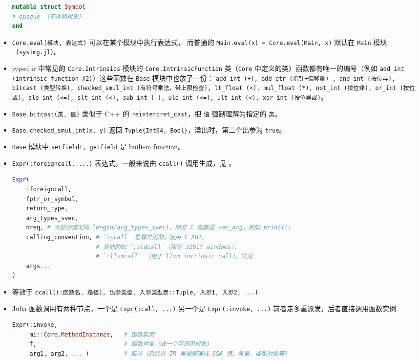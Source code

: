 \begin{itemize}
\begin{lstlisting}[language=julia]
mutable struct Symbol
# opaque （不透明对象）
end
\end{lstlisting}
\item \verb`Core.eval(模块, 表达式)` 可以在某个模块中执行表达式， 而普通的 \verb`Main.eval(x) = Core.eval(Main, x)` 默认在 \verb`Main` 模块（\verb`sysimg.jl`）。
\item typed ir 中常见的 \verb`Core.Intrinsics` 模块的 \verb`Core.IntrinsicFunction` 类（\verb`Core` 中定义的类）函数都有唯一的编号（例如 \verb`add_int (intrinsic function #2)`）这些函数在 \verb`Base` 模块中也放了一份： \verb`add_int (+), add_ptr (指针+偏移量) , and_int (按位与), bitcast (类型转换), checked_smul_int (有符号乘法，带上限检查), lt_float (<), mul_float (*), not_int (按位非), or_int (按位或), sle_int (<=), slt_int (<), sub_int (-), ule_int (<=), ult_int (<), xor_int (按位异或)`。
\item \verb`Base.bitcast(类, 值)` 类似于 C++ 的 \verb`reinterpret_cast`，把 \verb`值` 强制理解为指定的 \verb`类`。
\item \verb`Base.checked_smul_int(x, y)` 返回 \verb`Tuple{Int64, Bool}`，溢出时，第二个出参为 \verb`true`。
\item \verb`Base` 模块中 \verb`setfield!, getfield` 是 built-in function。
\item \verb`Expr(:foreigncall, ...)` 表达式，一般来说由 \verb`ccall()` 调用生成，见 。
\begin{lstlisting}[language=julia]
Expr(
    :foreigncall,
    fptr_or_symbol,
    return_type,
    arg_types_svec,
    nreq, # 大部分情况同 length(arg_types_svec)，除非 C 函数是 var_arg，例如 printf()
    calling_convention, # `:ccall` 是最常见的，使用 C ABI。
                        # 其他的如 `:stdcall`（用于 32bit windows），
                        # `:llvmcall` （用于 llvm intrinsic call），罕见
    args...
)
\end{lstlisting}
\item 等效于 \verb`ccall((:函数名, 路径), 出参类型, 入参类型表::Tuple, 入参1, 入参2, ...)`
\item Julia 函数调用有两种节点，一个是 \verb`Expr(:call, ...)` 另一个是 \verb`Expr(:invoke, ...)` 前者走多重派发，后者直接调用函数实例
\begin{lstlisting}[language=julia]
Expr(:invoke,
     mi::Core.MethodInstance,   # 函数实例
     f,                         # 函数对象（或一个可调用对象）
     arg1, arg2, ... )          # 实参（已经在 IR 里被整理成 SSA 值、常量、类型对象等）
\end{lstlisting}
\end{itemize}

